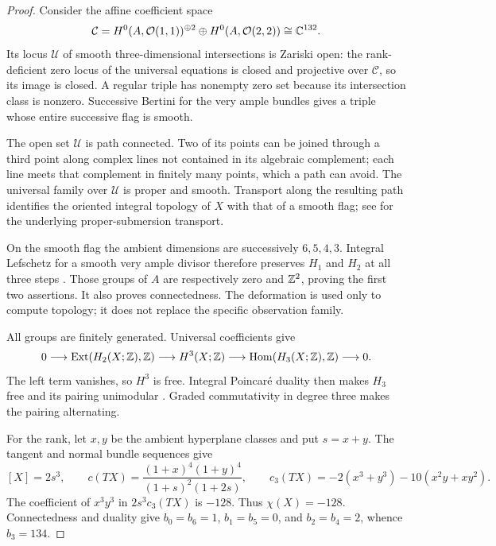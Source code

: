 \begin{proof}
Consider the affine coefficient space
\begin{equation}\label{eq:full-coefficients}
 \mathcal C=H^0(A,\mathcal O(1,1))^{\oplus2}
                       \oplus H^0(A,\mathcal O(2,2))\cong\mathbb C^{132}.
\end{equation}
Its locus $\mathcal U$ of smooth three-dimensional intersections
is Zariski open: the rank-deficient zero locus of the universal
equations is closed and projective over $\mathcal C$, so its image
is closed. A regular triple has nonempty zero set because its
intersection class is nonzero. Successive Bertini for the very ample
bundles gives a triple whose entire successive flag is smooth.

The open set $\mathcal U$ is path connected. Two of its points
can be joined through a third point along complex lines not contained
in its algebraic complement; each line meets that complement in
finitely many points, which a path can avoid. The universal family
over $\mathcal U$ is proper and smooth. Transport along the resulting
path identifies the oriented integral topology of $X$ with that of
a smooth flag; see \cite[\S\S1,3]{Ehresmann} for the underlying
proper-submersion transport.

On the smooth flag the ambient dimensions are successively $6,5,4,3$.
Integral Lefschetz for a smooth very ample divisor therefore preserves
$H_1$ and $H_2$ at all three steps
\cite[Corollary~7.3 and Theorem~7.4]{Milnor}. Those groups of $A$
are respectively zero and $\mathbb Z^2$, proving the first two assertions.
It also proves connectedness. The deformation is used only to
compute topology; it does not replace the specific observation family.

All groups are finitely generated. Universal coefficients give
\[
 0\longrightarrow\operatorname{Ext}(H_2(X;\mathbb Z),\mathbb Z)
 \longrightarrow H^3(X;\mathbb Z)
 \longrightarrow\operatorname{Hom}(H_3(X;\mathbb Z),\mathbb Z)
 \longrightarrow0.
\]
The left term vanishes, so $H^3$ is free. Integral Poincar\'e duality
then makes $H_3$ free and its pairing unimodular
\cite[Theorems~3.2, 3.30 and Proposition~3.38]{Hatcher}.
Graded commutativity in degree three makes the pairing alternating.

For the rank, let $x,y$ be the ambient hyperplane classes and put
$s=x+y$. The tangent and normal bundle sequences give
\begin{equation}\label{eq:cicy-euler-data}
 [X]=2s^3,\qquad
 c(TX)=\frac{(1+x)^4(1+y)^4}{(1+s)^2(1+2s)},\qquad
 c_3(TX)=-2(x^3+y^3)-10(x^2y+xy^2).
\end{equation}
The coefficient of $x^3y^3$ in $2s^3c_3(TX)$ is $-128$.
Thus $\chi(X)=-128$. Connectedness and duality give
$b_0=b_6=1$, $b_1=b_5=0$, and $b_2=b_4=2$, whence $b_3=134$.
\end{proof}

